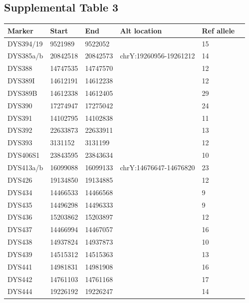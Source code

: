 \subsection{Supplemental Table 3}
\label{tab:sursuptab3}
\begin{tabularx}{\linewidth}{l l l l l l }
\hline
Marker & Start & End & Alt location & Ref allele \\
\hline
DYS394/19   & 9521989  & 9522052  &                        & 15 \\
DYS385a/b   & 20842518 & 20842573 & chrY:19260956-19261212 & 14 \\
DYS388      & 14747535 & 14747570 &                        & 12 \\
DYS389I     & 14612191 & 14612238 &                        & 12 \\
DYS389B     & 14612338 & 14612405 &                        & 29 \\
DYS390      & 17274947 & 17275042 &                        & 24 \\
DYS391      & 14102795 & 14102838 &                        & 11 \\
DYS392      & 22633873 & 22633911 &                        & 13 \\
DYS393      & 3131152  & 3131199  &                        & 12 \\
DYS406S1    & 23843595 & 23843634 &                        & 10 \\
DYS413a/b   & 16099088 & 16099133 & chrY:14676647-14676820 & 23 \\
DYS426      & 19134850 & 19134885 &                        & 12 \\
DYS434      & 14466533 & 14466568 &                        & 9  \\
DYS435      & 14496298 & 14496333 &                        & 9  \\
DYS436      & 15203862 & 15203897 &                        & 12 \\
DYS437      & 14466994 & 14467057 &                        & 16 \\
DYS438      & 14937824 & 14937873 &                        & 10 \\
DYS439      & 14515312 & 14515363 &                        & 13 \\
DYS441      & 14981831 & 14981908 &                        & 16 \\
DYS442      & 14761103 & 14761168 &                        & 17 \\
DYS444      & 19226192 & 19226247 &                        & 14 \\

\end{tabularx}
